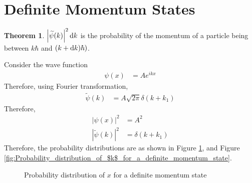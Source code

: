 \documentclass[titlepage, fleqn, a4paper, 12pt, twoside]{article}
\theoremstyle{definition}
\theoremstyle{theorem}
\newtheorem{theorem}{Theorem}
\renewcommand{\tilde}{\widetilde}
\begin{document}
\section{Definite Momentum States}

\begin{theorem}
	$\left| \tilde{\psi}(k) \right|^2 \dif k$ is the probability of the momentum of a particle being between $k \hbar$ and $(k + \dif k) \hbar)$.
\end{theorem}

Consider the wave function
\begin{align*}
	\psi(x) &= A e^{i k x}
\end{align*}
Therefore, using Fourier transformation,
\begin{align*}
	\tilde{\psi}(k) &= A \sqrt{2 \pi} \delta(k + k_1)
\end{align*}
Therefore,
\begin{align*}
	\left| \psi(x) \right|^2 &= A^2\\
	\left| \tilde{\psi}(k) \right|^2 &= \delta(k + k_1)
\end{align*}
Therefore, the probability distributions are as shown in Figure \ref{fig:Probability_distribution_of_$x$_for_a_definite_momentum_state}, and Figure \ref{fig:Probability_distribution_of_$k$_for_a_definite_momentum_state}.

\begin{figure}[h]
	\centering
	\caption{Probability distribution of $x$ for a definite momentum state}
	\label{fig:Probability_distribution_of_$x$_for_a_definite_momentum_state}
\end{figure}
\end{document}
